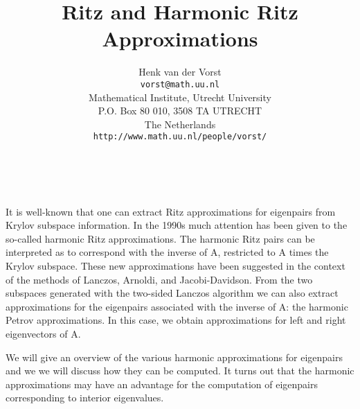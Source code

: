 \documentclass[11pt]{article}
\date{ ~ \hspace{-4mm}}
\title{Ritz and Harmonic Ritz Approximations  }
\author{Henk van der Vorst \\ {\tt vorst@math.uu.nl} \\ Mathematical Institute, Utrecht University  \\  P.O. Box 80 010, 3508 TA UTRECHT  \\  The Netherlands  \\  {\tt http://www.math.uu.nl/people/vorst/}}
\begin{document}
\maketitle
\thispagestyle{empty}





 



It is well-known that one can extract Ritz approximations for eigenpairs
from Krylov subspace information. In the 1990s much attention has been
given to the so-called harmonic Ritz approximations. The harmonic Ritz
pairs can be interpreted as to correspond with the inverse of A, restricted
to A times the Krylov subspace. These new approximations have been
suggested in the context of the methods of Lanczos, Arnoldi, and
Jacobi-Davidson. From the two subspaces generated with the two-sided Lanczos 
algorithm we can also extract approximations for the eigenpairs associated
with the inverse of A: the harmonic Petrov approximations. In this case,
we obtain approximations for left and right eigenvectors of A.




We will give an overview of the various harmonic approximations for
eigenpairs and we we will discuss how they can be computed. It turns
out that the harmonic approximations may have an advantage for the
computation of eigenpairs corresponding to interior eigenvalues.    

 
\end{document}
